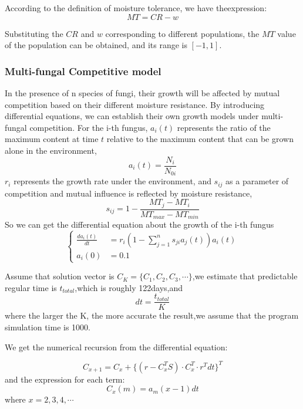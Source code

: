 \documentclass{mcmthesis}
\begin{document}
According to the definition of moisture tolerance, we have theexpression: 
\begin{equation} 
	MT=CR-w
\end{equation}

Substituting the $CR$ and $w$ corresponding to different populations, the $MT$ value of the population can be obtained, and its range is $[-1,1]$.
\subsubsection{Multi-fungal Competitive model}
In the presence of n species of fungi, their growth will be affected by mutual competition based on their different moisture resistance. By introducing differential equations, we can establish their own growth models under multi-fungal competition. For the i-th fungus, $a_{i}(t)$ represents the ratio of the maximum content at time $t$ relative to the maximum content that can be grown alone in the environment,
\begin{equation} 
	a_{i}(t)=\frac{N_{i}}{N_{0i}}
\end{equation}
$r_{i}$ represents the growth rate under the environment, and $s_{ij}$ as a parameter of competition and mutual influence is reflected by moisture resistance,
\begin{equation} 
	s_{ij}=1-\frac{MT_{j}-MT_{i}}{MT_{max}-MT_{min}}
\end{equation}
So we can get the differential equation about the growth of the i-th fungus
\begin{equation} 
	\left\{ 
	\begin{aligned}
		\frac{da_{i}(t)}{dt}&=r_{i}(1-\sum_{j=1}^{n}s_{ji}a_{j}(t))a_{i}(t)
		\\a_{i}(0)&=0.1
	\end{aligned}
	\right. 
\end{equation} 

Assume that solution vector is $C_{K}=\{C_{1},C_{2},C_{3},\cdots\}$,we estimate that predictable regular time is $t_{total}$,which is roughly 122days,and
\begin{equation} 
	dt=\frac{t_{total}}{K}
\end{equation} 
where the larger the K, the more accurate the result,we assume that the program simulation time is 1000.

We get the numerical recursion from the differential equation:

\begin{equation}
	C_{x+1}=C_{x}+\{(r-C_{x}^{T}S){\cdot}C_{x}^{T}{\cdot}r^{T}dt\}^{T}
\end{equation}
and the expression for each term:
\begin{equation}
	C_{x}(m)=a_{m}(x-1)dt
\end{equation} 
where $x=2,3,4,\cdots$
\end{document}
